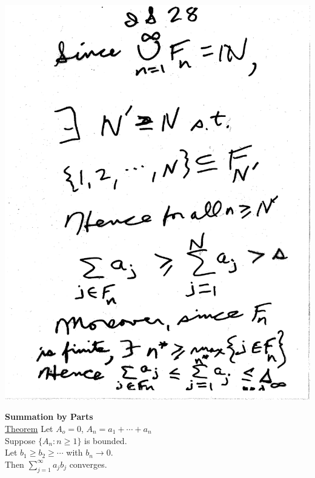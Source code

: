 \documentclass[10pt,a4paper]{article}
\begin{document}
\includegraphics[scale=.5]{Pages/IS_28}

\newpage

\textbf{Summation by Parts}
\vspace{2mm}
\\ \noindent \underline{Theorem} Let $A_o = 0$, $A_n = a_1 + \cdots + a_n$ 
\\ Suppose $\{ A_n: n\geq 1\}$ is bounded.
\\ Let $b_1 \geq b_2 \geq \cdots $ with $b_n \rightarrow 0.$
\\ \noindent Then $\sum_{j=1}^{\infty} a_j b_j$ converges.
\end{document}
